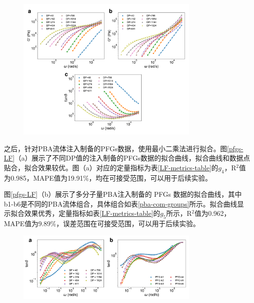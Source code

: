 \begin{figure}[htbp]
  \centering
  \includegraphics[width=0.8\textwidth]{Fig/pba-LF.pdf}
\end{figure}

之后，针对PBA流体注入制备的PFGs数据，使用最小二乘法进行拟合。图\ref{pfgs-LF}（a）展示了不同DP值的注入制备的PFGs数据的拟合曲线，拟合曲线和数据点贴合，拟合效果较优。图（a）对应的定量指标为表\ref{LF-metrics-table}的$g_4$，R$^2$值为0.985，MAPE值为19.91\%，均在可接受范围，可以用于后续实验。

图\ref{pfgs-LF}（b）展示了多分子量PBA注入制备的 PFGs 数据的拟合曲线，其中b1-b6是不同的PBA流体组合，具体组合如表\ref{pba-com-groups}所示。拟合曲线显示拟合效果优秀，定量指标如表\ref{LF-metrics-table}的$g_5$所示，R$^2$值为0.962，MAPE值为9.89\%，误差范围在可接受范围，可以用于后续实验。
\begin{figure}[htbp]
  \centering
  \includegraphics[width=0.8\textwidth]{Fig/pfgs-LF.pdf}
\end{figure}

